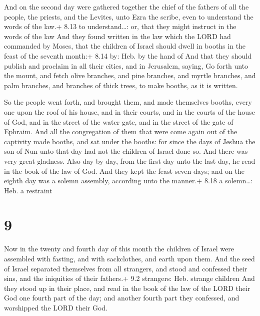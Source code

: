  And on the second day were gathered together the chief
of the fathers of all the people, the priests, and the Levites, unto
Ezra the scribe, even to understand the words of the law.+ 8.13 to
understand\ldots: or, that they might instruct in the words of the law
 And they found written in the law which the LORD had
commanded by Moses, that the children of Israel should dwell in booths
in the feast of the seventh month:+ 8.14 by: Heb. by the hand of
 And that they should publish and proclaim in all their
cities, and in Jerusalem, saying, Go forth unto the mount, and fetch
olive branches, and pine branches, and myrtle branches, and palm
branches, and branches of thick trees, to make booths, as it is written.

 So the people went forth, and brought them, and made
themselves booths, every one upon the roof of his house, and in their
courts, and in the courts of the house of God, and in the street of the
water gate, and in the street of the gate of Ephraim.  And
all the congregation of them that were come again out of the captivity
made booths, and sat under the booths: for since the days of Jeshua the
son of Nun unto that day had not the children of Israel done so. And
there was very great gladness.  Also day by day, from the
first day unto the last day, he read in the book of the law of God. And
they kept the feast seven days; and on the eighth day was a solemn
assembly, according unto the manner.+ 8.18 a solemn\ldots: Heb. a
restraint

\hypertarget{section-8}{%
\section{9}\label{section-8}}

 Now in the twenty and fourth day of this month the children
of Israel were assembled with fasting, and with sackclothes, and earth
upon them.  And the seed of Israel separated themselves from
all strangers, and stood and confessed their sins, and the iniquities of
their fathers.+ 9.2 strangers: Heb. strange children  And
they stood up in their place, and read in the book of the law of the
LORD their God one fourth part of the day; and another fourth part they
confessed, and worshipped the LORD their God.

